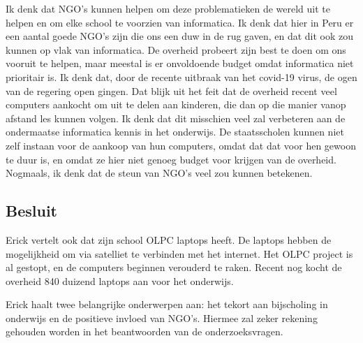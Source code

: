 Ik denk dat NGO's kunnen helpen om deze problematieken de wereld uit te helpen en om elke school te voorzien van informatica. Ik denk dat hier in Peru er een aantal goede NGO's zijn die ons een duw in de rug gaven, en dat dit ook zou kunnen op vlak van informatica. De overheid probeert zijn best te doen om ons vooruit te helpen, maar meestal is er onvoldoende budget omdat informatica niet prioritair is. Ik denk dat, door de recente uitbraak van het covid-19 virus, de ogen van de regering open gingen. Dat blijk uit het feit dat de overheid recent veel computers aankocht om uit te delen aan kinderen, die dan op die manier vanop afstand les kunnen volgen. Ik denk dat dit misschien veel zal verbeteren aan de ondermaatse informatica kennis in het onderwijs. De staatsscholen kunnen niet zelf instaan voor de aankoop van hun computers, omdat dat dat voor hen gewoon te duur is, en omdat ze hier niet genoeg budget voor krijgen van de overheid. Nogmaals, ik denk dat de steun van NGO's veel zou kunnen betekenen.

\subsection{Besluit}
Erick vertelt ook dat zijn school OLPC laptops heeft. De laptops hebben de mogelijkheid om via satelliet te verbinden met het internet. Het OLPC project is al gestopt, en de computers beginnen verouderd te raken. Recent nog kocht de overheid 840 duizend laptops aan voor het onderwijs. \autocite{Riofrio2020}

Erick haalt twee belangrijke onderwerpen aan: het tekort aan bijscholing in onderwijs en de positieve invloed van NGO's. Hiermee zal zeker rekening gehouden worden in het beantwoorden van de onderzoeksvragen.